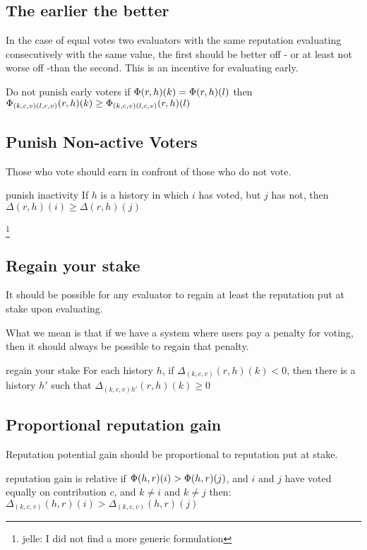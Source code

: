 \documentclass{article}
\begin{document}
\subsection{The earlier the better}


In the case of equal votes two evaluators with the same reputation evaluating consecutively with the same value, the first should be better off - or at least not worse off -than the second. This is an incentive for evaluating early.
\begin{condition}{Do not punish early voters}
if $\Phi(r, h)(k) = \Phi(r, h)(l)$ then $\Phi_{(k, c, v)(l,c,v)}(r, h)(k) \geq  \Phi_{(k, c, v)(l, c, v)}(r, h)(l)$
\end{condition}

\subsection{Punish Non-active Voters}

Those who vote should earn in confront of those who do not vote.
\begin{condition}{punish inactivity}
If $h$ is a history in which $i$ has voted, but $j$ has not, then
$\Delta(r, h)(i) \geq \Delta(r, h)(j)$
\end{condition}
\footnote{jelle: I did not find a more generic formulation}


\subsection{Regain your stake}
It should be possible for any evaluator to regain at least the reputation put at stake upon evaluating.

What we mean is that if we have a system where users pay a penalty for voting, then it should always be possible to regain that penalty. 
\begin{condition}{regain your stake}
For each history $h$, if $\Delta_{(k, c, v)}(r, h)(k) < 0$, then there is a history $h'$ such that $\Delta_{(k,c,v)h'}(r, h)(k) \geq 0$ 
\end{condition}


\subsection{Proportional reputation gain}
Reputation potential gain should be proportional to reputation put at stake.

\begin{condition}{reputation gain is relative}
if $\Phi(h,r)(i) > \Phi(h, r)(j)$, and $i$ and $j$ have voted equally on contribution $c$, and $k \neq i$ and $k \neq j$ then:
$\Delta_{(k,c,v)}(h, r)(i) > \Delta_{(k,c,v)}(h, r)(j)$
\end{condition}
\end{document}
